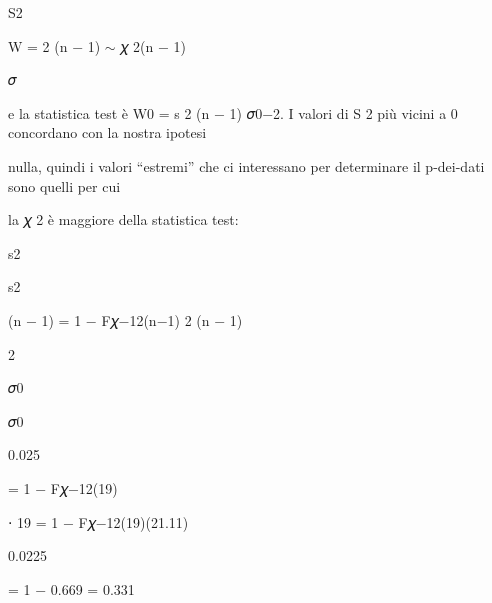 \documentclass[a4paper,portrait,12pt]{article}
\begin{document}
\begin{flushleft}
S2
\end{flushleft}


\begin{flushleft}
W = 2 (n $-$ 1) $\sim$ 𝜒 2(n $-$ 1)
\end{flushleft}


\begin{flushleft}
𝜎
\end{flushleft}


\begin{flushleft}
e la statistica test \`{e} W0 = s 2 (n $-$ 1) 𝜎0$-$2. I valori di S 2 più vicini a 0 concordano con la nostra ipotesi
\end{flushleft}


\begin{flushleft}
nulla, quindi i valori {``}estremi'' che ci interessano per determinare il p-dei-dati sono quelli per cui
\end{flushleft}


\begin{flushleft}
la 𝜒 2 \`{e} maggiore della statistica test:
\end{flushleft}


\begin{flushleft}
s2
\end{flushleft}


\begin{flushleft}
s2
\end{flushleft}


\begin{flushleft}
(n $-$ 1) = 1 $-$ F𝜒$-$12(n$-$1) 2 (n $-$ 1)
\end{flushleft}


2


\begin{flushleft}
𝜎0
\end{flushleft}


\begin{flushleft}
𝜎0
\end{flushleft}


0.025


\begin{flushleft}
= 1 $-$ F𝜒$-$12(19)
\end{flushleft}


\begin{flushleft}
⋅ 19 = 1 $-$ F𝜒$-$12(19)(21.11)
\end{flushleft}


0.0225


= 1 $-$ 0.669 = 0.331
\end{document}
